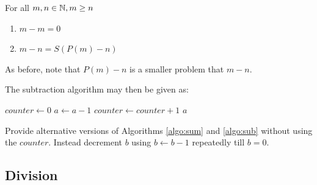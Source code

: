For all $m,n \in \mathbb{N}, m \geq n$
\begin{enumerate}
\item $m - m = 0$
\item $m - n = S(P(m) - n)$
\end{enumerate}
As before, note that $P(m)-n$ is a smaller problem that $m-n$.

The subtraction algorithm may then be given as:


\begin{algorithm}
\begin{algorithmic}[1]
\State $counter \leftarrow 0$
	\State $a \leftarrow  a - 1$
	\State $counter \leftarrow counter + 1$
\EndWhile
\Return $a$
\EndProcedure
\end{algorithmic}
\caption{An algorithm for $a-b$, $a \geq b$ by  $-1$ $b$-times. }
\label{algo:sub}
\end{algorithm}

\begin{exercise}
Provide alternative versions of Algorithms \ref{algo:sum} and \ref{algo:sub} without using the $counter$. Instead decrement $b$ using $b \leftarrow b-1$ repeatedly till $b = 0$.
\end{exercise}

\subsection{Division}

